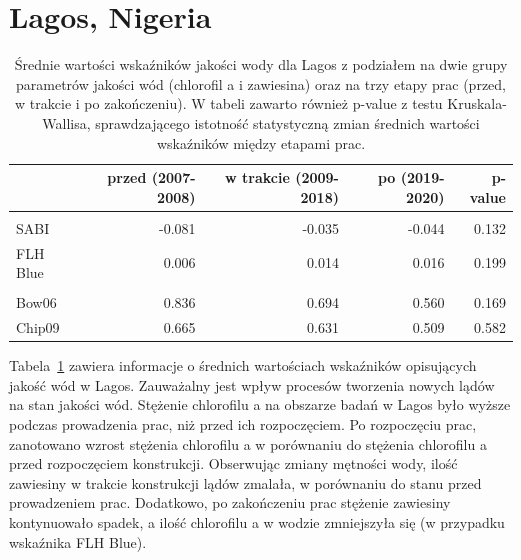 \documentclass{amuthesis}
\begin{document}
\hypertarget{lagos-nigeria-1}{%
\section{Lagos, Nigeria}\label{lagos-nigeria-1}}

\hypertarget{tbl-lg_stats}{}
\begin{table}
\caption{\label{tbl-lg_stats}Średnie wartości wskaźników jakości wody dla Lagos z podziałem na dwie
grupy parametrów jakości wód (chlorofil a i zawiesina) oraz na trzy
etapy prac (przed, w trakcie i po zakończeniu). W tabeli zawarto również
p-value z testu Kruskala-Wallisa, sprawdzającego istotność statystyczną
zmian średnich wartości wskaźników między etapami prac. }\tabularnewline

\centering
\begin{tabular}{lrrrr}
\toprule
  & przed (2007-2008) & w trakcie (2009-2018) & po (2019-2020) & p-value\\
\midrule
\addlinespace[0.3em]
\multicolumn{5}{l}{\textbf{chlorofil a}}\\
\hspace{1em}SABI & -0.081 & -0.035 & -0.044 & 0.132\\
\hspace{1em}FLH Blue & 0.006 & 0.014 & 0.016 & 0.199\\
\addlinespace[0.3em]
\multicolumn{5}{l}{\textbf{zawiesina}}\\
\hspace{1em}Bow06 & 0.836 & 0.694 & 0.560 & 0.169\\
\hspace{1em}Chip09 & 0.665 & 0.631 & 0.509 & 0.582\\
\bottomrule
\end{tabular}
\end{table}

Tabela~\ref{tbl-lg_stats} zawiera informacje o średnich wartościach
wskaźników opisujących jakość wód w Lagos. Zauważalny jest wpływ
procesów tworzenia nowych lądów na stan jakości wód. Stężenie chlorofilu
a na obszarze badań w Lagos było wyższe podczas prowadzenia prac, niż
przed ich rozpoczęciem. Po rozpoczęciu prac, zanotowano wzrost stężenia
chlorofilu a w porównaniu do stężenia chlorofilu a przed rozpoczęciem
konstrukcji. Obserwując zmiany mętności wody, ilość zawiesiny w trakcie
konstrukcji lądów zmalała, w porównaniu do stanu przed prowadzeniem
prac. Dodatkowo, po zakończeniu prac stężenie zawiesiny kontynuowało
spadek, a ilość chlorofilu a w wodzie zmniejszyła się (w przypadku
wskaźnika FLH Blue).
\end{document}
